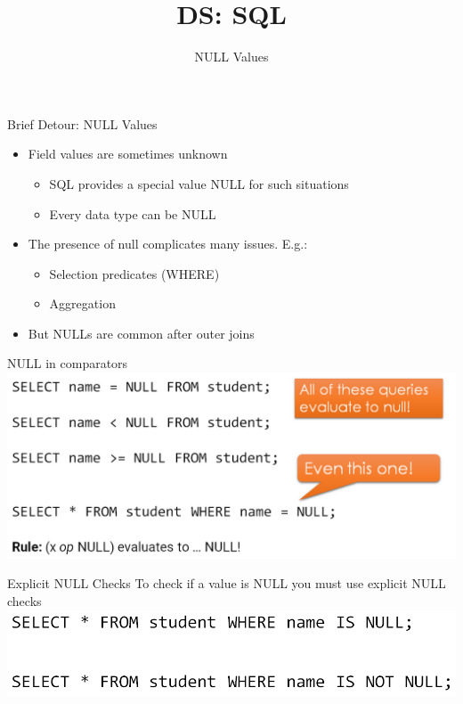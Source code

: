 \documentclass[aspectratio=169]{../latex_main/tntbeamer}  %
\title[Introduction]{DS: SQL}
\subtitle{NULL Values}
\begin{document}
	
	\maketitle
	\begin{frame}[c]{Brief Detour: NULL Values}
	    \begin{itemize}
	        \item Field values are sometimes unknown
	        \begin{itemize}
	            \item SQL provides a special value NULL for such situations
	            \item Every data type can be NULL
	        \end{itemize}
	        \item The presence of null complicates many issues. E.g.:
	        \begin{itemize}
	            \item Selection predicates (WHERE)
	            \item Aggregation
	        \end{itemize}
	        \item But NULLs are common after outer joins
	    \end{itemize}
	\end{frame}
	
	
	\begin{frame}{NULL in comparators}
	    \includegraphics[scale=.5]{Bild23}
	\end{frame}
	
	
	
	\begin{frame}[c]{Explicit NULL Checks}
    	To check if a value is NULL you must use explicit NULL checks\\
	    \includegraphics[scale=.5]{Bild24}
	\end{frame}
	
\end{document}
